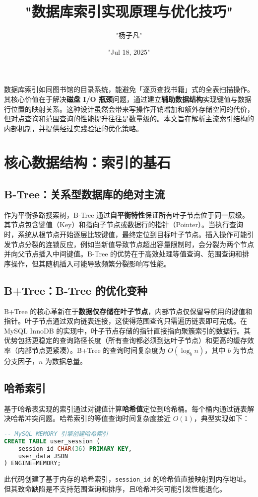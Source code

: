 \title{"数据库索引实现原理与优化技巧"}
\author{"杨子凡"}
\date{"Jul 18, 2025"}
\maketitle
数据库索引如同图书馆的目录系统，能避免「逐页查找书籍」式的全表扫描操作。其核心价值在于解决\textbf{磁盘 I/O 瓶颈}问题，通过建立\textbf{辅助数据结构}实现键值与数据行位置的映射关系。这种设计虽然会带来写操作开销增加和额外存储空间的代价，但对点查询和范围查询的性能提升往往是数量级的。本文旨在解析主流索引结构的内部机制，并提供经过实践验证的优化策略。\par
\chapter{核心数据结构：索引的基石}
\section{B-Tree：关系型数据库的绝对主流}
作为平衡多路搜索树，B-Tree 通过\textbf{自平衡特性}保证所有叶子节点位于同一层级。其节点包含键值（Key）和指向子节点或数据行的指针（Pointer）。当执行查询时，系统从根节点开始逐层比较键值，最终定位到目标叶子节点。插入操作可能引发节点分裂的连锁反应，例如当新值导致节点超出容量限制时，会分裂为两个节点并向父节点插入中间键值。B-Tree 的优势在于高效处理等值查询、范围查询和排序操作，但其随机插入可能导致频繁分裂影响写性能。\par
\section{B+Tree：B-Tree 的优化变种}
B+Tree 的核心革新在于\textbf{数据仅存储在叶子节点}，内部节点仅保留导航用的键值和指针。叶子节点通过双向链表连接，这使得范围查询只需遍历链表即可完成。在 MySQL InnoDB 的实现中，叶子节点存储的指针直接指向聚簇索引的数据行。其优势包括更稳定的查询路径长度（所有查询都必须到达叶子节点）和更高的缓存效率（内部节点更紧凑）。B+Tree 的查询时间复杂度为 $O(\log_b n)$，其中 $b$ 为节点分支因子，$n$ 为数据总量。\par
\section{哈希索引}
基于哈希表实现的索引通过对键值计算\textbf{哈希值}定位到哈希桶。每个桶内通过链表解决哈希冲突问题。哈希索引的等值查询时间复杂度接近 $O(1)$，典型实现如下：\par
\begin{lstlisting}[language=sql]
-- MySQL MEMORY 引擎创建哈希索引
CREATE TABLE user_session (
    session_id CHAR(36) PRIMARY KEY,
    user_data JSON
) ENGINE=MEMORY;
\end{lstlisting}
此代码创建了基于内存的哈希索引，\texttt{session\_{}id} 的哈希值直接映射到内存地址。但其致命缺陷是不支持范围查询和排序，且哈希冲突可能引发性能退化。\par
